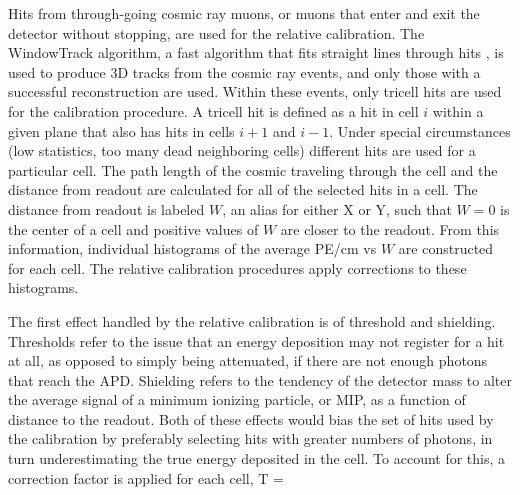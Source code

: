 Hits from through-going cosmic ray muons, or muons that enter and exit the detector without stopping, are used for the relative calibration. The WindowTrack algorithm, a fast algorithm that fits straight lines through hits \cite{ref:RecoWinTrack}, is used to produce 3D tracks from the cosmic ray events, and only those with a successful reconstruction are used. Within these events, only tricell hits are used for the calibration procedure. A tricell hit is defined as a hit in cell $i$ within a given plane that also has hits in cells $i+1$ and $i-1$. Under special circumstances (low statistics, too many dead neighboring cells) different hits are used for a particular cell. The path length of the cosmic traveling through the cell and the distance from readout are calculated for all of the selected hits in a cell. The distance from readout is labeled $W$, an alias for either X or Y, such that $W = 0$ is the center of a cell and positive values of $W$ are closer to the readout. From this information, individual histograms of the average PE/cm vs $W$ are constructed for each cell. The relative calibration procedures apply corrections to these histograms.

The first effect handled by the relative calibration is of threshold and shielding. Thresholds refer to the issue that an energy deposition may not register for a hit at all, as opposed to simply being attenuated, if there are not enough photons that reach the APD. Shielding refers to the tendency of the detector mass to alter the average signal of a minimum ionizing particle, or MIP, as a function of distance to the readout. Both of these effects would bias the set of hits used by the calibration by preferably selecting hits with greater numbers of photons, in turn underestimating the true energy deposited in the cell. To account for this, a correction factor is applied for each cell,
\beq
T =  \cdot {}
\label{eq:CalibThreshold}
\eeq

